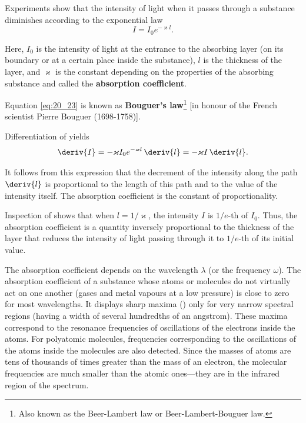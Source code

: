 Experiments show that the intensity of light when it passes through a substance diminishes according to the exponential law
\begin{equation}\label{eq:20_23}
	I = I_0 e^{-\varkappa l}.
\end{equation}

\noindent
Here, $I_0$ is the intensity of light at the entrance to the absorbing layer (on its boundary or at a certain place inside the substance), $l$ is the thickness of the layer, and $\varkappa$ is the constant depending on the properties of the absorbing substance and called the \textbf{absorption coefficient}.

Equation \eqref{eq:20_23} is known as \textbf{Bouguer's law}\footnote{Also known as the Beer-Lambert law or Beer-Lambert-Bouguer law.} [in honour of the French scientist Pierre Bouguer (1698-1758)].

Differentiation of  yields
\begin{equation}\label{eq:20_24}
	\deriv{I} = - \varkappa I_0 e^{-\varkappa l}\, \deriv{l} = -\varkappa I\, \deriv{l}.
\end{equation}

\noindent
It follows from this expression that the decrement of the intensity along the path $\deriv{l}$ is proportional to the length of this path and to the value of the intensity itself.
The absorption coefficient is the constant of proportionality.

Inspection of  shows that when $l=1/\varkappa$, the intensity $I$ is $1/e$-th of $I_0$.
Thus, the absorption coefficient is a quantity inversely proportional to the thickness of the layer that reduces the intensity of light passing through it to $1/e$-th of its initial value.

The absorption coefficient depends on the wavelength $\lambda$ (or the frequency $\omega$).
The absorption coefficient of a substance whose atoms or molecules do not virtually act on one another (gases and metal vapours at a low pressure) is close to zero for most wavelengths.
It displays sharp maxima () only for very narrow spectral regions (having a width of several hundredths of an angstrom).
These maxima correspond to the resonance frequencies of oscillations of the electrons inside the atoms.
For polyatomic molecules, frequencies corresponding to the oscillations of the atoms inside the molecules are also detected.
Since the masses of atoms are tens of thousands of times greater than the mass of an electron, the molecular frequencies are much smaller than the atomic ones---they are in the infrared region
of the spectrum.

